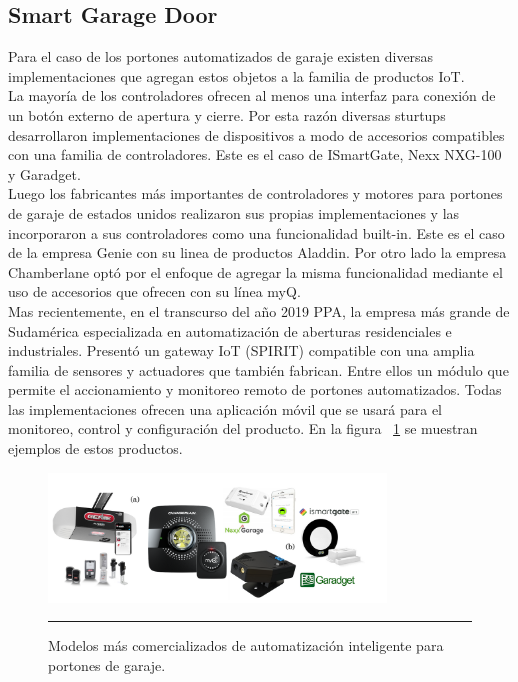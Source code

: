 \subsection{Smart Garage Door}
Para el caso de los portones automatizados de garaje existen diversas implementaciones que agregan estos objetos a la familia de productos IoT.\\
La mayoría de los controladores ofrecen al menos una interfaz para conexión de un botón externo de apertura y cierre. Por esta razón diversas sturtups desarrollaron implementaciones de dispositivos a modo de accesorios compatibles con una familia de controladores. Este es el caso de ISmartGate, Nexx NXG-100 y Garadget.\\
Luego los fabricantes más importantes de controladores y motores para portones de garaje de estados unidos realizaron sus propias implementaciones y las incorporaron a sus controladores como una funcionalidad built-in. Este es el caso de la empresa Genie con su linea de productos Aladdin. Por otro lado la empresa Chamberlane optó por el enfoque de agregar la misma funcionalidad mediante el uso de accesorios que ofrecen con su línea myQ.\\
Mas recientemente, en el transcurso del año 2019 PPA, la empresa más grande de Sudamérica especializada en automatización de aberturas residenciales e industriales. Presentó un gateway IoT (SPIRIT) compatible con una amplia familia de sensores y actuadores que también fabrican. Entre ellos un módulo que permite el accionamiento y monitoreo remoto de portones automatizados.
Todas las implementaciones ofrecen una aplicación móvil que se usará para el monitoreo, control y configuración del producto.
En la figura ~\ref{fig:smartgates} se muestran ejemplos de estos productos.

\begin{figure}[htbp]
	\centering
	\includegraphics[width=0.8\textwidth]{Pictures/smartgates.png}
	\rule{35em}{1pt}
	\caption[Smart Garage Gates]{Modelos más comercializados de automatización inteligente para portones de garaje.}
	\label{fig:smartgates}
\end{figure}

